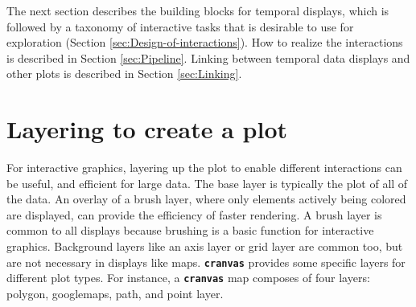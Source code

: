 \documentclass[12pt]{article}
\begin{document}

The next section describes the building blocks for temporal displays, which is followed by a taxonomy of interactive tasks that is desirable to use for exploration (Section \ref{sec:Design-of-interactions}). How to realize the interactions is described in Section \ref{sec:Pipeline}. Linking between temporal data displays and other plots is described in Section \ref{sec:Linking}.


\section{Layering to create a plot\label{sec:graph-layers}}

For interactive graphics, layering up the plot to enable
different interactions can be useful, and efficient for
large data. The base layer is typically the plot of all
of the data. An overlay of a brush layer, where only
elements actively being colored are displayed, can provide
the efficiency of faster rendering. A brush layer is
common to all displays because brushing is a basic function
for interactive graphics. Background layers like an axis
layer or grid layer are common too, but are not necessary
in displays like maps. \texttt{\textbf{cranvas}} provides
some specific layers for different plot types. For instance,
a \texttt{\textbf{cranvas}} map composes of four layers:
polygon, googlemaps, path, and point layer.

\end{document}
